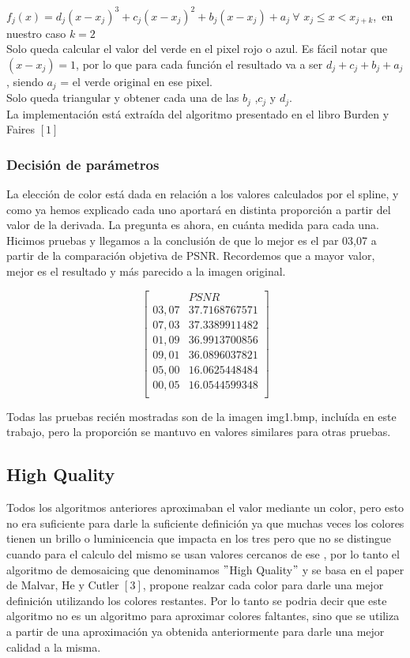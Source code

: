 $f_j(x) = d_j(x-x_j)^3 + c_j(x-x_j)^2 + b_j(x-x_j) + a_j\ \forall$ $x_j \leq x < x_{j+k}$,\ en nuestro caso $k = 2$ \\

Solo queda calcular el valor del verde en el pixel rojo o azul.
Es fácil notar que $(x-x_j) = 1$, por lo que para cada función el resultado va a ser $d_j+c_j+b_j+a_j$, siendo $a_j$ = el verde original en ese pixel.\\
Solo queda triangular y obtener cada una de las $b_j$ ,$c_j$ y $d_j$.\\
La implementación está extraída del algoritmo presentado en el libro Burden y Faires $[1]$

\subsubsection{Decisión de parámetros}
La elección de color está dada en relación a los valores calculados por el spline, y como ya hemos explicado cada uno aportará en distinta proporción a partir del valor de la derivada. La pregunta es ahora, en cuánta medida para cada una. Hicimos pruebas y llegamos a la conclusión de que lo mejor es el par 03,07 a partir de la comparación objetiva de PSNR. Recordemos que a mayor valor, mejor es el resultado y más parecido a la imagen original.

$$ 
\begin{bmatrix}
           &          PSNR          \\
       03,07   &      37.7168767571 \\
       07,03   &      37.3389911482 \\
       01,09   &      36.9913700856 \\
       09,01   &      36.0896037821 \\
       05,00   &      16.0625448484 \\       
       00,05   &      16.0544599348 \\
\end{bmatrix} 
$$

Todas las pruebas recién mostradas son de la imagen img1.bmp, incluída en este trabajo, pero la proporción se mantuvo en valores similares para otras pruebas.

\subsection{High Quality}

Todos los algoritmos anteriores aproximaban el valor mediante un color, pero esto no era suficiente para darle la suficiente definición ya que muchas veces los colores tienen un brillo o luminicencia que impacta en los tres pero que no se distingue cuando para el calculo del mismo se usan valores cercanos de ese , por lo tanto el algoritmo de demosaicing que denominamos $"$High Quality$"
$ y se basa en el paper de Malvar, He y Cutler $[3]$, propone realzar cada color para darle una mejor definición utilizando los colores restantes. Por lo tanto se podria decir que este algoritmo no es un algoritmo para aproximar colores faltantes, sino que se utiliza a partir de una aproximación ya obtenida anteriormente para darle una mejor calidad a la misma.

